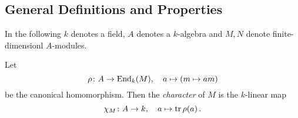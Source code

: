 \subsection{General Definitions and Properties}


\begin{conventions}
  In the following $k$ denotes a field, $A$ denotes a $k$-algebra and $M, N$ denote finite-dimensionl $A$-modules.
\end{conventions}


\begin{definition}
  Let
  \[
            \rho
    \colon  A
    \to     \operatorname{End}_k(M),
    \quad   a
    \mapsto (m \mapsto am)
  \]
  be the canonical homomorphism.
  Then the \emph{character} of $M$ is the $k$-linear map
  \[
            \chi_M
    \colon  A
    \to     k,
    \quad   a
    \mapsto \operatorname{tr} \rho(a) \,.
  \]
\end{definition}


